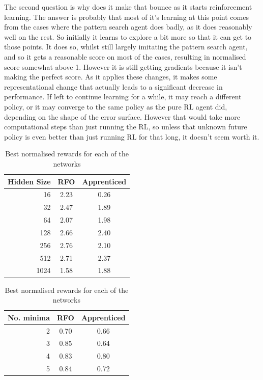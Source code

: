 The second question is why does it make that bounce as it starts reinforcement learning. The answer is probably that most of it's learning at this point comes from the cases where the pattern search agent does badly, as it does reasonably well on the rest. So initially it learns to explore a bit more so that it can get to those points. It does so, whilst still largely imitating the pattern search agent, and so it gets a reasonable score on most of the cases, resulting in normalised score somewhat above 1. However it is still getting gradients because it isn't making the perfect score. As it applies these changes, it makes some representational change that actually leads to a significant decrease in performance. If left to continue learning for a while, it may reach a different policy, or it may converge to the same policy as the pure RL agent did, depending on the shape of the error surface. However that would take more computational steps than just running the RL, so unless that unknown future policy is even better than just running RL for that long, it doesn't seem worth it.

\begin{table}[hbtp]
\centering
\begin{tabular}{r | cc}
Hidden Size & RFO & Apprenticed \\
\hline
16 & 2.23 & 0.26 \\
32 & 2.47 & 1.89 \\
64 & 2.07 & 1.98\\
128 & 2.66 & 2.40 \\
256 & 2.76 & 2.10 \\
512 & 2.71 & 2.37 \\
1024 & 1.58 & 1.88 \\

\end{tabular}
%
\begin{tabular}{r | cc}
No. minima & RFO & Apprenticed \\
\hline
2 & 0.70 & 0.66 \\
3 & 0.85 &  0.64 \\
4 &0.83  & 0.80 \\
5 & 0.84 & 0.72 \\

\end{tabular}


\caption{Best normalised rewards for each of the networks}
\label{tab:compare}

\end{table}

